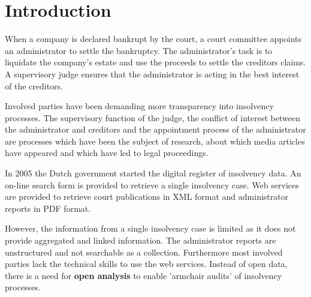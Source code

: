 \section{Introduction}
When a company is declared bankrupt by the court, a court committee appoints an administrator to settle the bankruptcy. The administrator's task is to liquidate the company's estate and use the proceeds to settle the creditors claims. A supervisory judge ensures that the administrator is acting in the best interest of the creditors. 

Involved parties have been demanding more transparency into insolvency processes. The supervisory function of the judge, the conflict of interest between the administrator and creditors and the appointment process of the administrator are processes which have been the subject of research\cite{boluk_2011}, about which media articles have appeared \cite{dennis_meneer_2018:1, dennis_meneer_2017:1, jan-hein_strop_2015:1} and which have led to legal proceedings.   

\begin{comment}
Other benefits: Supervisory judges with significant work load could benefit from data driven supervision. Information access to the general public and journalists to this processes  would provide additional checks and balances.
\end{comment}

In 2005 the Dutch government started the digital register of insolvency data\cite{rechtspraak:cir}. An on-line search form \cite{rechtspraak:cir-zoeken} is provided to retrieve a single insolvency case. Web services are provided to retrieve court publications in XML format and administrator reports in PDF format. 

However, the information from a single insolvency case is limited as it does not provide aggregated and linked information. The administrator reports are unstructured and not searchable as a collection. Furthermore most involved parties lack the technical skills to use the web services. Instead of open data, there is a need for \textbf{open analysis} to enable 'armchair audits'\cite{o_leary_2015} of insolvency processes.

